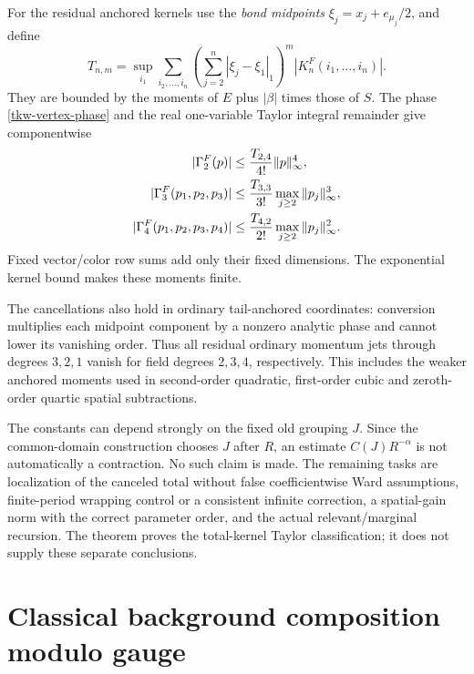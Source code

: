 \documentclass[11pt]{article}
\theoremstyle{remark}
\begin{document}
For the residual anchored kernels use the \emph{bond midpoints}
\(\xi_j=x_j+e_{\mu_j}/2\), and define
\begin{equation}
 T_{n,m}=\sup_{i_1}\sum_{i_2,\ldots,i_n}
  \left(\sum_{j=2}^n|\xi_j-\xi_1|_1\right)^m
                  |K_n^F(i_1,\ldots,i_n)|.
 \label{tkw-moments}
\end{equation}
They are bounded by the moments of \(E\) plus
\(|\beta|\) times those of \(S\). The phase
\eqref{tkw-vertex-phase} and the real one-variable
Taylor integral remainder give componentwise
\begin{align}
 |\Gamma_2^F(p)|
   &\le \frac{T_{2,4}}{4!}\|p\|_\infty^4,\notag\\
 |\Gamma_3^F(p_1,p_2,p_3)|
   &\le \frac{T_{3,3}}{3!}
                  \max_{j\ge2}\|p_j\|_\infty^3,\notag\\
 |\Gamma_4^F(p_1,p_2,p_3,p_4)|
   &\le \frac{T_{4,2}}{2!}
                  \max_{j\ge2}\|p_j\|_\infty^2 .
 \label{tkw-quantitative}
\end{align}
Fixed vector/color row sums add only their fixed dimensions.
The exponential kernel bound makes these moments finite.

The cancellations also hold in ordinary tail-anchored
coordinates: conversion multiplies each midpoint component
by a nonzero analytic phase and cannot lower its vanishing
order. Thus all residual ordinary momentum jets through
degrees \(3,2,1\) vanish for field degrees \(2,3,4\),
respectively. This includes the weaker anchored moments
used in second-order quadratic, first-order cubic and
zeroth-order quartic spatial subtractions.

The constants can depend strongly on the fixed old grouping
\(J\). Since the common-domain construction chooses \(J\)
after \(R\), an estimate \(C(J)R^{-\alpha}\) is not
automatically a contraction. No such claim is made.
The remaining tasks are localization of the canceled
total without false coefficientwise Ward assumptions,
finite-period wrapping control or a consistent infinite
correction, a spatial-gain norm with the correct parameter
order, and the actual relevant/marginal recursion.
The theorem proves the total-kernel Taylor classification;
it does not supply these separate conclusions.

\section{Classical background composition modulo gauge}
\label{csg-section}
\end{document}
